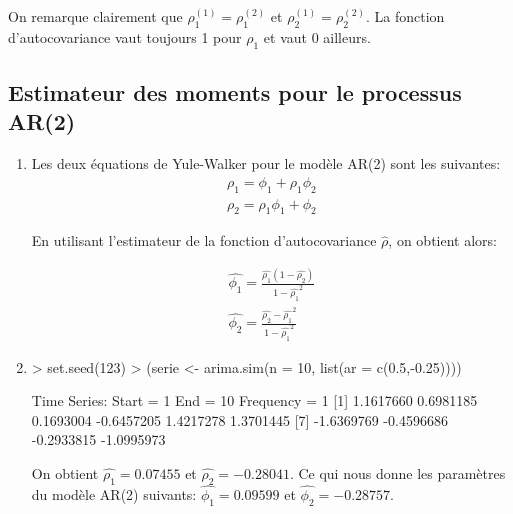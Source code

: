 \documentclass{article}
\begin{document}
On remarque clairement que $\rho_1^{(1)} = \rho_1^{(2)}$ et $\rho_2^{(1)} = \rho_2^{(2)}$. 
La fonction d'autocovariance vaut toujours 1 pour $\rho_1$ et vaut 0 ailleurs.

\clearpage
\subsection{Estimateur des moments pour le processus AR(2)}
\begin{enumerate}
\item 
Les deux équations de Yule-Walker pour le modèle AR(2) sont les suivantes:
\begin{align*}
\rho_1 = \phi_1 + \rho_1 \phi_2 \\
\rho_2 = \rho_1\phi_1 + \phi_2
\end{align*}

En utilisant l'estimateur de la fonction d'autocovariance $\hat{\rho}$, on obtient alors:

\begin{align*}
\hat{\phi_1} = \frac{\hat{\rho_1}(1-\hat{\rho_2})}{1-\hat{\rho_1}^2} \\
\hat{\phi_2} = \frac{\hat{\rho_2} - \hat{\rho_1}^2}{1-\hat{\rho_1}^2}
\end{align*}


\item

\begin{Schunk}
\begin{Sinput}
> set.seed(123)
> (serie <- arima.sim(n = 10, list(ar = c(0.5,-0.25))))
\end{Sinput}
\begin{Soutput}
Time Series:
Start = 1 
End = 10 
Frequency = 1 
 [1]  1.1617660  0.6981185  0.1693004 -0.6457205  1.4217278  1.3701445
 [7] -1.6369769 -0.4596686 -0.2933815 -1.0995973
\end{Soutput}
\end{Schunk}

On obtient $ = 0.07455$ et $ = -0.28041$. 
Ce qui nous donne les paramètres du modèle AR(2) suivants:
$ = 0.09599$ et 
$ = -0.28757$.
\end{enumerate}
\end{document}
